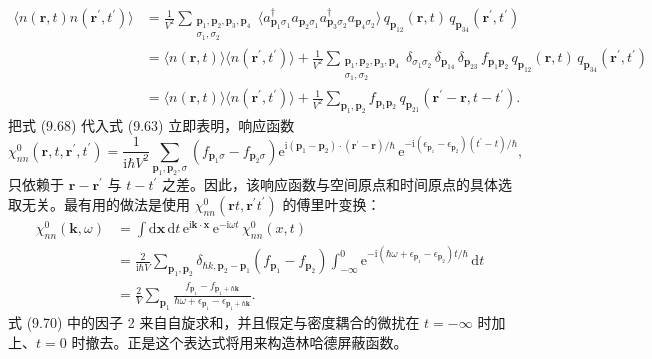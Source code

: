 \begin{equation*}
\begin{aligned}
\langle n(\mathbf{r},t)n(\mathbf{r}^{\prime},t^{\prime})\rangle&=\frac{1}{V^2}\sum_{\substack{\mathbf{p}_1,\mathbf{p}_2,\mathbf{p}_3,\mathbf{p}_4\\ \sigma_1,\sigma_2}}\langle a_{\mathbf{p}_1\sigma_1}^{\dagger}a_{\mathbf{p}_2\sigma_1}a_{\mathbf{p}_3\sigma_2}^{\dagger}a_{\mathbf{p}_4\sigma_2}\rangle\,q_{\mathbf{p}_{12}}(\mathbf{r},t)\,q_{\mathbf{p}_{34}}(\mathbf{r}^{\prime},t^{\prime})\\
&=\langle n(\mathbf{r},t)\rangle\langle n(\mathbf{r}^{\prime},t^{\prime})\rangle+\frac{1}{V^2}\sum_{\substack{\mathbf{p}_1,\mathbf{p}_2,\mathbf{p}_3,\mathbf{p}_4\\ \sigma_1,\sigma_2}}\delta_{\sigma_1\sigma_2}\,\delta_{\mathbf{p}_{14}}\,\delta_{\mathbf{p}_{23}}\,f_{\mathbf{p}_1\mathbf{p}_2}\,q_{\mathbf{p}_{12}}(\mathbf{r},t)\,q_{\mathbf{p}_{34}}(\mathbf{r}^{\prime},t^{\prime})\\
&=\langle n(\mathbf{r},t)\rangle\langle n(\mathbf{r}^{\prime},t^{\prime})\rangle+\frac{1}{V^2}\sum_{\mathbf{p}_1,\mathbf{p}_2}f_{\mathbf{p}_1\mathbf{p}_2}\,q_{\mathbf{p}_{21}}(\mathbf{r}^{\prime}-\mathbf{r},t-t^{\prime}).
\end{aligned}\tag{9.68}
\end{equation*}
把式 (9.68) 代入式 (9.63) 立即表明，响应函数
\begin{equation*}
\chi_{nn}^{0}(\mathbf{r},t,\mathbf{r}^{\prime},t^{\prime})=\frac{1}{\mathrm{i}\hbar V^2}\sum_{\mathbf{p}_1,\mathbf{p}_2,\sigma}\left(f_{\mathbf{p}_1\sigma}-f_{\mathbf{p}_2\sigma}\right)\mathrm{e}^{\mathrm{i}(\mathbf{p}_1-\mathbf{p}_2)\cdot(\mathbf{r}^{\prime}-\mathbf{r})/\hbar}\,\mathrm{e}^{-\mathrm{i}(\epsilon_{\mathbf{p}_1}-\epsilon_{\mathbf{p}_2})(t^{\prime}-t)/\hbar},\tag{9.69}
\end{equation*}
只依赖于 $\mathbf{r}-\mathbf{r}^{\prime}$ 与 $t-t^{\prime}$ 之差。因此，该响应函数与空间原点和时间原点的具体选取无关。最有用的做法是使用 $\chi_{nn}^{0}(\mathbf{r}t,\mathbf{r}^{\prime}t^{\prime})$ 的傅里叶变换：
\begin{equation*}
\begin{aligned}
\chi_{nn}^{0}(\mathbf{k},\omega)&=\int\mathrm{d}\mathbf{x}\,\mathrm{d}t\,\mathrm{e}^{\mathrm{i}\mathbf{k}\cdot\mathbf{x}}\,\mathrm{e}^{-\mathrm{i}\omega t}\,\chi_{nn}^{0}(x,t)\\
&=\frac{2}{\mathrm{i}\hbar V}\sum_{\mathbf{p}_1,\mathbf{p}_2}\delta_{\hbar k,\mathbf{p}_2-\mathbf{p}_1}\left(f_{\mathbf{p}_1}-f_{\mathbf{p}_2}\right)\int_{-\infty}^{0}\mathrm{e}^{-\mathrm{i}(\hbar\omega+\epsilon_{\mathbf{p}_1}-\epsilon_{\mathbf{p}_2})t/\hbar}\,\mathrm{d}t\\
&=\frac{2}{V}\sum_{\mathbf{p}_1}\frac{f_{\mathbf{p}_1}-f_{\mathbf{p}_1+\hbar\mathbf{k}}}{\hbar\omega+\epsilon_{\mathbf{p}_1}-\epsilon_{\mathbf{p}_1+\hbar\mathbf{k}}}.
\end{aligned}\tag{9.70}
\end{equation*}
式 (9.70) 中的因子 2 来自自旋求和，并且假定与密度耦合的微扰在 $t=-\infty$ 时加上、$t=0$ 时撤去。正是这个表达式将用来构造林哈德屏蔽函数。

